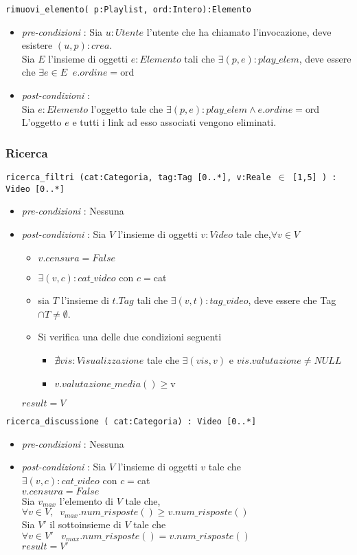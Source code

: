 \documentclass[12pt, letterpaper]{article}
\newcommand{\code}[1]{\colorbox{light-gray}{\texttt{#1}}}
\newcommand{\id}{{\hphantom{ident}}}
\begin{document}
\code{rimuovi\_elemento( p:Playlist, ord:Intero):Elemento}\begin{itemize}
    \item \textit{pre-condizioni} : Sia $u:Utente$ l'utente che ha chiamato l'invocazione,
          deve esistere $(u,p):crea$. \\
          Sia $E$ l'insieme di oggetti $e:Elemento$ tali che $\exists (p,e):play\_elem$, deve
          essere che $\exists e\in E\;\;e.ordine=$ord
    \item \textit{post-condizioni} : \\
          \id  Sia $e:Elemento$ l'oggetto tale che $\exists (p,e):play\_elem\land e.ordine=$ord\\
          \id L'oggetto $e$ e tutti i link ad esso associati vengono eliminati.
\end{itemize}
\subsubsection{Ricerca}
\code{ricerca\_filtri (cat:Categoria, tag:Tag [0..*], v:Reale $\in$ [1,5] ) : Video [0..*]}\begin{itemize}
    \item\textit{pre-condizioni} : Nessuna
    \item \textit{post-condizioni} : Sia $V$ l'insieme di oggetti $v:Video$ tale che,$\forall v\in V$\begin{itemize}
              \item $v.censura=False$
              \item $\exists (v,c):cat\_video$ con $c=$cat
              \item sia $T$ l'insieme di $t.Tag$ tali che $\exists (v,t):tag\_video$, deve essere che Tag$\cap T\ne \emptyset$.
              \item Si verifica una delle due condizioni seguenti\begin{itemize}
                        \item $\nexists vis:Visualizzazione$ tale che $\exists(vis,v)$ e $vis.valutazione\ne NULL$
                        \item $v.valutazione\_media()\ge $v
                    \end{itemize}
          \end{itemize}
          $result=V$
\end{itemize}
\code{ricerca\_discussione ( cat:Categoria) : Video [0..*]}\begin{itemize}
    \item \textit{pre-condizioni} : Nessuna
    \item \textit{post-condizioni} : Sia $V$ l'insieme di oggetti $v$ tale che\\
          \id  $\exists (v,c):cat\_video$ con $c=$cat \\
          \id $v.censura=False$\\
          Sia $v_{max}$ l'elemento di $V$ tale che, $\forall v\in V,\;\;v_{max}.num\_risposte()\ge v.num\_risposte()$\\
          Sia $V'$ il sottoinsieme di $V$ tale che $\forall v\in V'\;\;\;v_{max}.num\_risposte()= v.num\_risposte()$\\
          $result=V'$
\end{itemize}
\end{document}
